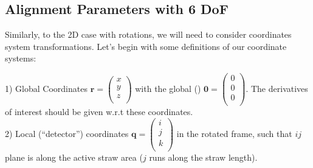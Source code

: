 \documentclass[a4paper,11pt]{article}
\begin{document}
\subsection{Alignment Parameters with 6 DoF}

Similarly, to the 2D case with rotations, we will need to consider coordinates system transformations. Let's begin with some definitions of our coordinate systems: 

1) Global Coordinates $\textbf{r}=\begin{pmatrix}x\\y\\z\\\end{pmatrix}$ with the global () $\textbf{0}=\begin{pmatrix}0\\0\\0\\\end{pmatrix}$. The derivatives of interest should be given w.r.t these coordinates. \\
2) Local (“detector”) coordinates  $\textbf{q}=\begin{pmatrix}i\\j\\k\\\end{pmatrix}$ in the rotated frame, such that $ij$ plane is along the active straw area ($j$ runs along the straw length). \\
\end{document}
